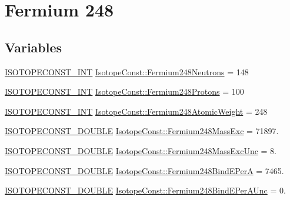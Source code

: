 \hypertarget{group___isotope_const-_fermium-_fm248}{}\section{Fermium 248}
\label{group___isotope_const-_fermium-_fm248}
\subsection*{Variables}
\begin{DoxyCompactItemize}
\item 
\mbox{\hyperlink{group___isotope_const-_macros_ga5f18360b3e99483a35c32d789e62621c}{I\+S\+O\+T\+O\+P\+E\+C\+O\+N\+S\+T\+\_\+\+I\+NT}} \mbox{\hyperlink{group___isotope_const-_fermium-_fm248_gac1765a34c15c1f0761b115ed322767ae}{Isotope\+Const\+::\+Fermium248\+Neutrons}} = 148
\item 
\mbox{\hyperlink{group___isotope_const-_macros_ga5f18360b3e99483a35c32d789e62621c}{I\+S\+O\+T\+O\+P\+E\+C\+O\+N\+S\+T\+\_\+\+I\+NT}} \mbox{\hyperlink{group___isotope_const-_fermium-_fm248_ga81d5ef1939886a7c7784f4e5fe2a8869}{Isotope\+Const\+::\+Fermium248\+Protons}} = 100
\item 
\mbox{\hyperlink{group___isotope_const-_macros_ga5f18360b3e99483a35c32d789e62621c}{I\+S\+O\+T\+O\+P\+E\+C\+O\+N\+S\+T\+\_\+\+I\+NT}} \mbox{\hyperlink{group___isotope_const-_fermium-_fm248_gad2a3e0685b720415230ff526d9eacb53}{Isotope\+Const\+::\+Fermium248\+Atomic\+Weight}} = 248
\item 
\mbox{\hyperlink{group___isotope_const-_macros_ga8f45a7272ce02c0b4c65c44636ed719a}{I\+S\+O\+T\+O\+P\+E\+C\+O\+N\+S\+T\+\_\+\+D\+O\+U\+B\+LE}} \mbox{\hyperlink{group___isotope_const-_fermium-_fm248_ga3bbf0150469968d33bab16c7f98a2097}{Isotope\+Const\+::\+Fermium248\+Mass\+Exc}} = 71897.
\item 
\mbox{\hyperlink{group___isotope_const-_macros_ga8f45a7272ce02c0b4c65c44636ed719a}{I\+S\+O\+T\+O\+P\+E\+C\+O\+N\+S\+T\+\_\+\+D\+O\+U\+B\+LE}} \mbox{\hyperlink{group___isotope_const-_fermium-_fm248_gaf04d408532d6f68ee5e2bb908c64c1cd}{Isotope\+Const\+::\+Fermium248\+Mass\+Exc\+Unc}} = 8.
\item 
\mbox{\hyperlink{group___isotope_const-_macros_ga8f45a7272ce02c0b4c65c44636ed719a}{I\+S\+O\+T\+O\+P\+E\+C\+O\+N\+S\+T\+\_\+\+D\+O\+U\+B\+LE}} \mbox{\hyperlink{group___isotope_const-_fermium-_fm248_gae3cf5780ce51038513095e3a89afb11a}{Isotope\+Const\+::\+Fermium248\+Bind\+E\+PerA}} = 7465.
\item 
\mbox{\hyperlink{group___isotope_const-_macros_ga8f45a7272ce02c0b4c65c44636ed719a}{I\+S\+O\+T\+O\+P\+E\+C\+O\+N\+S\+T\+\_\+\+D\+O\+U\+B\+LE}} \mbox{\hyperlink{group___isotope_const-_fermium-_fm248_ga8f63de05bafae6b7c7656ff1e07d51c1}{Isotope\+Const\+::\+Fermium248\+Bind\+E\+Per\+A\+Unc}} = 0.

\end{DoxyCompactItemize}
